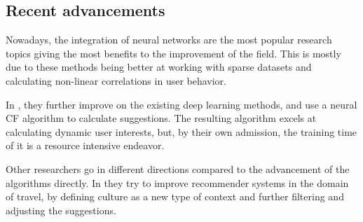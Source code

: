 \documentclass{article}
\begin{document}
\subsection{Recent advancements}
    Nowadays, the integration of neural networks are the most popular research topics giving the most benefits to the improvement of the field. This is mostly due to these methods being better at working with sparse datasets and calculating non-linear correlations in user behavior.
    \par In \cite{huang2024deep}, they further improve on the existing deep learning methods, and use a neural CF algorithm to calculate suggestions. The resulting algorithm excels at calculating dynamic user interests, but, by their own admission, the training time of it is a resource intensive endeavor.
    \par Other researchers go in different directions compared to the advancement of the algorithms directly. In \cite{hong2024cross} they try to improve recommender systems in the domain of travel, by defining culture as a new type of context and further filtering and adjusting the suggestions.



\end{document}
